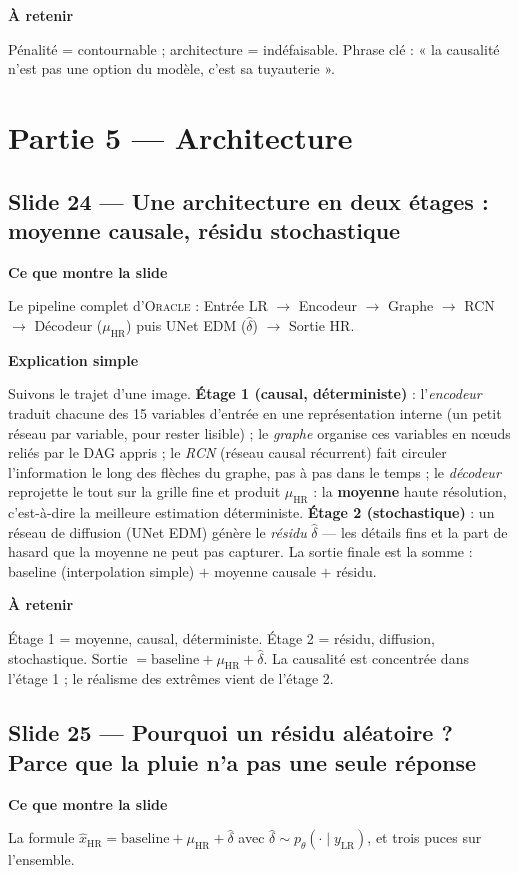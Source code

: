 \documentclass[11pt,a4paper]{article}
\newcommand{\slide}[2]{\subsection*{\textcolor{bleu}{Slide #1 --- #2}}}
\newcommand{\bloc}[1]{\par\medskip\noindent\textcolor{accent}{\textbf{#1}}\par\nopagebreak\smallskip}
\begin{document}
\bloc{À retenir}
Pénalité = contournable ; architecture = indéfaisable. Phrase clé : « la causalité n'est pas une option du modèle, c'est sa tuyauterie ».

\section{Partie 5 --- Architecture}

\slide{24}{Une architecture en deux étages : moyenne causale, résidu stochastique}

\bloc{Ce que montre la slide}
Le pipeline complet d'\textsc{Oracle} : Entrée LR $\to$ Encodeur $\to$ Graphe $\to$ RCN $\to$ Décodeur ($\mu_{\mathrm{HR}}$) puis UNet EDM ($\widehat\delta$) $\to$ Sortie HR.

\bloc{Explication simple}
Suivons le trajet d'une image. \textbf{Étage 1 (causal, déterministe)} : l'\emph{encodeur} traduit chacune des 15 variables d'entrée en une représentation interne (un petit réseau par variable, pour rester lisible) ; le \emph{graphe} organise ces variables en n\oe uds reliés par le DAG appris ; le \emph{RCN} (réseau causal récurrent) fait circuler l'information le long des flèches du graphe, pas à pas dans le temps ; le \emph{décodeur} reprojette le tout sur la grille fine et produit $\mu_{\mathrm{HR}}$ : la \textbf{moyenne} haute résolution, c'est-à-dire la meilleure estimation déterministe. \textbf{Étage 2 (stochastique)} : un réseau de diffusion (UNet EDM) génère le \emph{résidu} $\widehat\delta$ --- les détails fins et la part de hasard que la moyenne ne peut pas capturer. La sortie finale est la somme : baseline (interpolation simple) $+$ moyenne causale $+$ résidu.

\bloc{À retenir}
Étage 1 = moyenne, causal, déterministe. Étage 2 = résidu, diffusion, stochastique. Sortie $= \mathrm{baseline} + \mu_{\mathrm{HR}} + \widehat\delta$. La causalité est concentrée dans l'étage 1 ; le réalisme des extrêmes vient de l'étage 2.

\slide{25}{Pourquoi un résidu aléatoire ? Parce que la pluie n'a pas une seule réponse}

\bloc{Ce que montre la slide}
La formule $\widehat{x}_{\mathrm{HR}} = \mathrm{baseline} + \mu_{\mathrm{HR}} + \widehat{\delta}$ avec $\widehat\delta \sim p_\theta(\cdot \mid y_{\mathrm{LR}})$, et trois puces sur l'ensemble.
\end{document}
